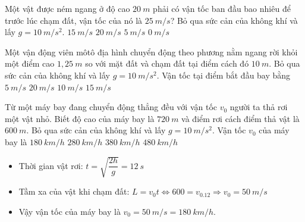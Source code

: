 \begin{ex}%
Một vật được ném ngang ở độ cao $20\ m$ phải có vận tốc ban đầu bao nhiêu để trước lúc chạm đất, vận tốc của nó là $25\ m/s$? Bỏ qua sức cản của không khí và lấy $g = 10\ m/s^2$.
\choice
{\True $15\ m/s$}
{$20\ m/s$}
{$5\ m/s$}
{$0\ m/s$}
 \end{ex}
\begin{ex}%
Một vận động viên môtô địa hình chuyển động theo phương nằm ngang rời khỏi một điểm cao $1,25\ m$ so với mặt đất và chạm đất tại điểm cách đó $10\ m$. Bỏ qua sức cản của không khí và lấy $g = 10\ m/s^2$. Vận tốc tại điểm bắt đầu bay bằng
\choice
{$5\ m/s$}
{\True $20\ m/s$}
{$10\ m/s$}
{$15\ m/s$}
 \end{ex}
\begin{ex}%
Từ một máy bay đang chuyển động thẳng đều với vận tốc $v_0$  người ta thả rơi một vật nhỏ. Biết độ cao của máy bay là $720\ m$ và điểm rơi cách điểm thả vật là $600\ m$. Bỏ qua sức cản của không khí và lấy $g = 10\ m/s^2$. Vận tốc $v_0$  của máy bay là
\choice
{\True $180\ km/h$}
{$280\ km/h$}
{$380\ km/h$}
{$480\ km/h$}
\loigiai
{
\begin{itemize}
\item Thời gian vật rơi: $t=\sqrt{\dfrac{2h}{g}}=12\ s$
\item Tầm xa của vật khi chạm đất: $L=v_0t\Leftrightarrow 600=v_0.12\Rightarrow v_0=50\ m/s$
\item Vậy vận tốc của máy bay là $v_0=50\ m/s=180\ km/h$. 
\end{itemize}
}
 \end{ex}

